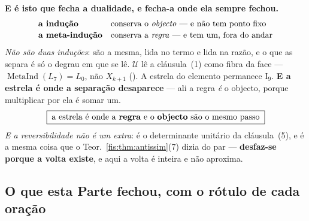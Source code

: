 \documentclass[livro.tex]{subfiles}
\begin{document}
\medskip\noindent\textbf{E é isto que fecha a dualidade, e fecha-a onde ela
sempre fechou.}
\[
\begin{array}{ll}
\textbf{a indução} & \text{conserva o \emph{objecto} --- e não tem ponto fixo}\\[2pt]
\textbf{a meta-indução} & \text{conserva a \emph{regra} --- e tem um, fora do andar}
\end{array}
\]
\emph{Não são duas induções}: são a mesma, lida no termo e lida na razão, e o que
as separa é só o degrau em que se lê. \(\mathcal{U}\) lê a cláusula~(1) como
fibra da face --- \(\operatorname{MetaInd}(L_7)=L_0\), não \(X_{k+1}\)
(). A estrela do elemento permanece
\(\mathrm{I}_{9}\). \textbf{E a estrela é onde a separação
desaparece} --- ali a regra \emph{é} o objecto, porque multiplicar por ela é somar
um.
\[
\boxed{\;\text{a estrela é onde a \textbf{regra} e o \textbf{objecto} são o mesmo passo}\;}
\]
\emph{E a reversibilidade não é um extra}: é o determinante unitário da
cláusula~(5), e é a mesma coisa que o Teor.~\ref{fis:thm:antissim}(7) dizia do
par --- \textbf{desfaz-se porque a volta existe}, e aqui a volta é inteira e não
aproxima.

\subsection*{O que esta Parte fechou, com o rótulo de cada oração}
\end{document}
